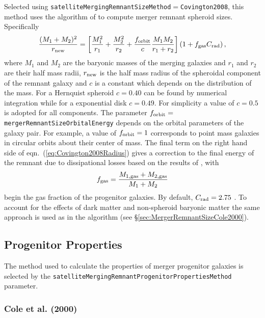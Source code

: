 Selected using {\tt satelliteMergingRemnantSizeMethod}$=${\tt Covington2008}, this method uses the algorithm of \cite{covington_predicting_2008} to compute merger remnant spheroid sizes. Specifically
\begin{equation}
\frac{(M_1+M_2)^2}{ r_{\rm new}} =
\left[ \frac{M_1^2}{r_1} + \frac{M_2^2}{r_2} + \frac{ f_{\rm orbit}}{c}
\frac{M_1 M_2}{r_1+r_2}\right] \left( 1 + f_{\rm gas} C_{\rm rad} \right),
\label{eq:Covington2008Radius}
\end{equation}
where $M_1$ and $M_2$ are the baryonic masses of the merging galaxies and $r_1$
and $r_2$ are their half mass radii, $r_{\rm new}$ is the half mass radius of the spheroidal \gls{component} of the remnant galaxy and $c$ is a constant which depends on the distribution of the mass. For a Hernquist spheroid $c=0.40$ can be found by numerical integration while for a exponential disk $c=0.49$. For simplicity a value of $c=0.5$ is adopted for all components. The parameter $f_{\rm orbit}=${\tt mergerRemnantSizeOrbitalEnergy} depends on the orbital parameters of the galaxy pair. For example, a value of $f_{\rm orbit} = 1$ corresponds to point mass galaxies in circular orbits about their center of mass. The final term on the right hand side of eqn.~(\ref{eq:Covington2008Radius}) gives a correction to the final energy of the remnant due to dissipational losses based on the results of \cite{covington_effects_2011}, with
\begin{equation}
 f_{\rm gas} = {M_{\rm 1,gas}+M_{\rm 2,gas} \over M_1+M_2}
\end{equation}
begin the gas fraction of the progenitor galaxies. By default, $C_{\rm rad}=2.75$ \citep{covington_effects_2011}. To account for the effects of dark matter and non-spheroid baryonic matter the same approach is used as in the \cite{cole_hierarchical_2000} algorithm (see \S\ref{sec:MergerRemnantSizeCole2000}). 

\subsection{Progenitor Properties}

The method used to calculate the properties of merger progenitor galaxies is selected by the {\tt satelliteMergingRemnantProgenitorPropertiesMethod} parameter.

\subsubsection{Cole et al. (2000)}

